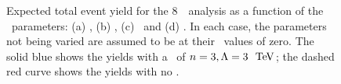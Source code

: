\begin{figure}[htbp]
\begin{center}
\caption{
\small
Expected total event yield for the 8~\tev\ analysis as a function of the \TGC\
parameters: (a) \ffourg, (b) \ffourZ, (c) \ffiveg\ and (d) \ffiveZ. In each
case, the parameters not being varied are assumed to be at their \sm\ values of
zero. The solid blue shows the yields with a \formfactor\ of $n=3,
\Lambda=3~\tev$; the dashed red curve shows the yields with no \formfactor.
 }
\label{fig:TGC-yield-curves}
\end{center}
\end{figure}


